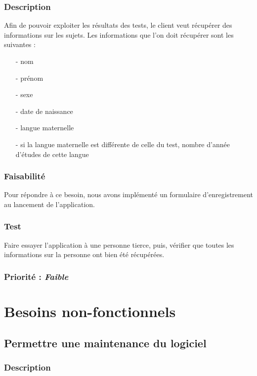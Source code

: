 \subsubsection{Description}

Afin de pouvoir exploiter les résultats des tests, le client veut récupérer des informations sur les sujets.
Les informations que l’on doit récupérer sont les suivantes :\\
\begin{itemize}
 \item[-]  nom
 \item[-]  prénom
 \item[-]  sexe
 \item[-]  date de naissance
 \item[-]  langue maternelle
 \item[-]  si la langue maternelle est différente de celle du test, nombre d’année d’études de cette langue
\end{itemize}

\subsubsection{Faisabilité}
  
	Pour répondre à ce besoin, nous avons implémenté un formulaire d’enregistrement au lancement de l’application.

\subsubsection{Test}

Faire essayer l’application à une personne tierce, puis, vérifier que toutes les informations sur la personne ont bien été récupérées.

\subsubsection{Priorité : \textit{Faible}}

\section{Besoins non-fonctionnels}\label{besoins_non-fonctionnels}

\subsection{Permettre une maintenance du logiciel}

\subsubsection{Description}

